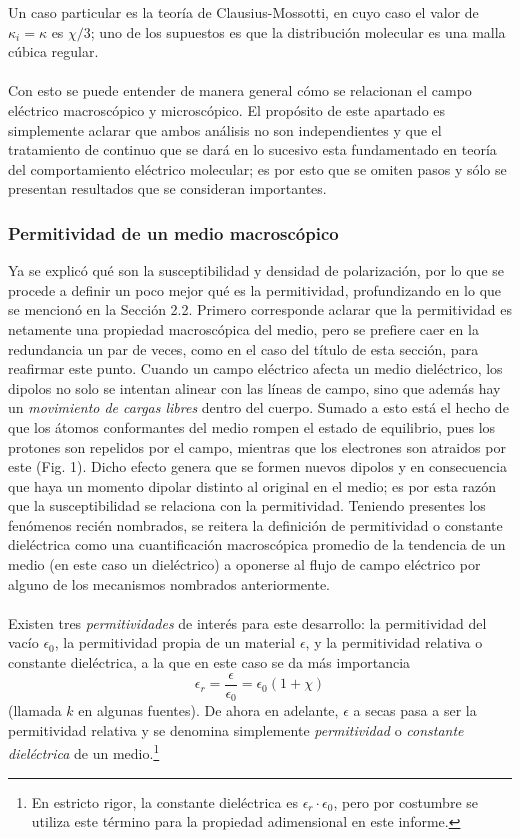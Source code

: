 \documentclass[12pt, notitlepage]{article}
\numberwithin{equation}{section}
\begin{document}
Un caso particular es la teoría de Clausius-Mossotti, en cuyo caso el valor de $\kappa_i = \kappa$ es $\chi/3$; uno de los supuestos es que la distribución molecular es una malla cúbica regular.\\\\
Con esto se puede entender de manera general cómo se relacionan el campo eléctrico macroscópico y microscópico. El propósito de este apartado es simplemente aclarar que ambos análisis no son independientes y que el tratamiento de continuo que se dará en lo sucesivo esta fundamentado en teoría del comportamiento eléctrico molecular; es por esto que se omiten pasos y sólo se presentan resultados que se consideran importantes.

\subsubsection{Permitividad de un medio macroscópico}
Ya se explicó qué son la susceptibilidad y densidad de polarización, por lo que se procede a definir un poco mejor qué es la permitividad, profundizando en lo que se mencionó en la Sección 2.2.
Primero corresponde aclarar que la permitividad es netamente una propiedad macroscópica del medio, pero se prefiere caer en la redundancia un par de veces, como en el caso del título de esta sección, para reafirmar este punto. Cuando un campo eléctrico afecta un medio dieléctrico, los dipolos no solo se intentan alinear con las líneas de campo, sino que además hay un \textit{movimiento de cargas libres} dentro del cuerpo. Sumado a esto está el hecho de que los átomos conformantes del medio rompen el estado de equilibrio, pues los protones son repelidos por el campo, mientras que los electrones son atraidos por este (Fig. 1). Dicho efecto genera que se formen nuevos dipolos y en consecuencia que haya un momento dipolar distinto al original en el medio; es por esta razón que la susceptibilidad se relaciona con la permitividad. Teniendo presentes los fenómenos recién nombrados, se reitera la definición de permitividad o constante dieléctrica como una cuantificación macroscópica promedio de la tendencia de un medio (en este caso un dieléctrico) a oponerse al flujo de campo eléctrico por alguno de los mecanismos nombrados anteriormente.\\\\
Existen tres \textit{permitividades} de interés para este desarrollo: la permitividad del vacío $\epsilon_0$, la permitividad propia de un material $\epsilon$, y la permitividad relativa o constante dieléctrica, a la que en este caso se da más importancia
\begin{equation}
\epsilon_r = \frac{\epsilon}{\epsilon_0}=\epsilon_0(1+\chi)
\end{equation}
(llamada $k$ en algunas fuentes). De ahora en adelante, $\epsilon$ a secas pasa a ser la permitividad relativa y se denomina simplemente \textit{permitividad} o \textit{constante dieléctrica} de un medio.\footnote{En estricto rigor, la constante dieléctrica es $\epsilon_r\cdot\epsilon_0$, pero por costumbre se utiliza este término para la propiedad adimensional en este informe.}
\end{document}
